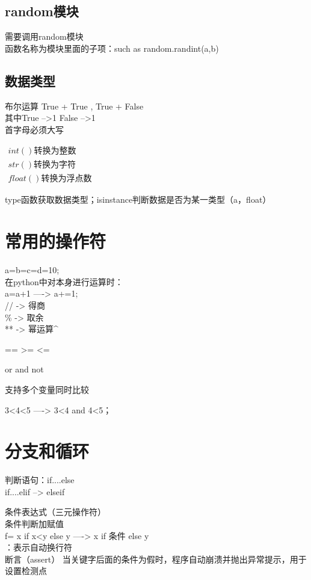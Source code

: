\documentclass[a4paper,10pt]{ctexart}
\begin{document}
\subsection{random模块}
\noindent 需要调用random模块
\\ 函数名称为模块里面的子项：such as random.randint(a,b)

\subsection{数据类型}
布尔运算
True + True , True + False \\
其中True -->1 False -->1 \\
首字母必须大写


\begin{math}
\begin{array}{c}
  int() 转换为整数\\
  str() 转换为字符\\
  float() 转换为浮点数
\end{array}
\end{math}

\noindent type函数获取数据类型；isinstance判断数据是否为某一类型（a，float）

\section{常用的操作符}
a=b=c=d=10;
\\ 在python中对本身进行运算时：
\\ a=a+1 ----> a+=1;
\\ //  -> 得商
\\ \%  -> 取余
\\ **  -> 幂运算\^{}

==  >=  <= \par
or \quad  and \quad not   \par
支持多个变量同时比较  \par
3<4<5 ----> 3<4 and 4<5；

\section{分支和循环}
判断语句：if....else
\\ if....elif --> elseif

条件表达式（三元操作符）\\
条件判断加赋值\\
f= x if x<y else y ----> x if 条件  else y\\
：表示自动换行符
\\
断言（assert） 当关键字后面的条件为假时，程序自动崩溃并抛出异常提示，用于设置检测点
\end{document}
